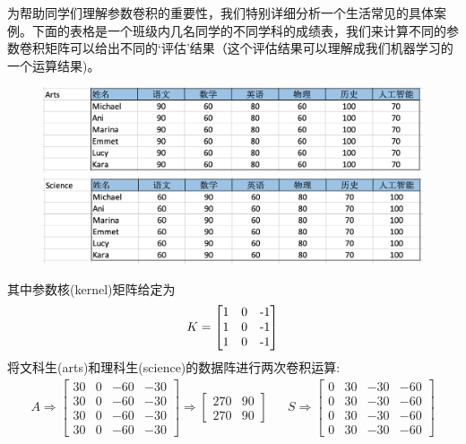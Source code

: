 \documentclass[12pt]{article}
\numberwithin{figure}{section}
\numberwithin{equation}{section}
\begin{document}
\begin{example}
为帮助同学们理解参数卷积的重要性，我们特别详细分析一个生活常见的具体案例。下面的表格是一个班级内几名同学的不同学科的成绩表，我们来计算不同的参数卷积矩阵可以给出不同的`评估'结果（这个评估结果可以理解成我们机器学习的一个运算结果)。
\begin{figure}[H]
	\centering
	\includegraphics[width=\textwidth]{fig/artsgrade}
	\includegraphics[width=\textwidth]{fig/sciencegrade}
\end{figure}
其中参数核(kernel)矩阵给定为
\begin{align*}
	K = \begin{bmatrix}
		1 & 0 & $-$1$$ \\
		1 & 0 & $-$1$$  \\
		1 & 0 & $-$1$$  
	\end{bmatrix}
\end{align*}
将文科生(arts)和理科生(science)的数据阵进行两次卷积运算:
\begin{align*}
	A \Rightarrow \begin{bmatrix}
		30 &    0  &   -60  &    -30 \\
       30  &     0  &    -60  &    -30   \\        
       30  &     0  &    -60  &   -30 \\
       30  &    0  &    -60  &   -30 
	\end{bmatrix} \Rightarrow \begin{bmatrix}
		270 & 90 \\
		270 & 90 
	\end{bmatrix} & & 	S \Rightarrow \begin{bmatrix}
	   0 & 30 & -30 & -60 \\
       0 & 30 &  -30 & -60 \\
        0 & 30 &  -30 & -60 \\
       0 & 30 &  -30 &  -60

\end{bmatrix}
\end{align*}
\end{example}
\end{document}
